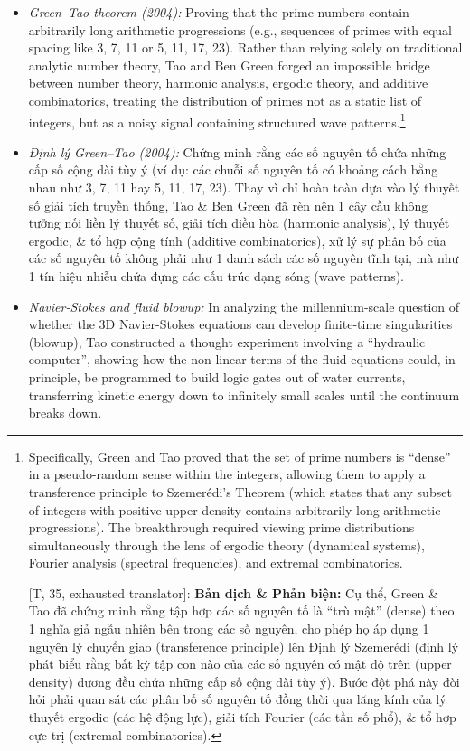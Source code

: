 \documentclass[11pt]{article}
\begin{document}
\begin{itemize}
    \item \emph{Green--Tao theorem (2004):} Proving that the prime numbers contain arbitrarily long arithmetic progressions (e.g., sequences of primes with equal spacing like 3, 7, 11 or 5, 11, 17, 23). Rather than relying solely on traditional analytic number theory, Tao and Ben Green forged an impossible bridge between number theory, harmonic analysis, ergodic theory, and additive combinatorics, treating the distribution of primes not as a static list of integers, but as a noisy signal containing structured wave patterns.\footnote{Specifically, Green and Tao proved that the set of prime numbers is ``dense'' in a pseudo-random sense within the integers, allowing them to apply a transference principle to Szemer\'edi's Theorem (which states that any subset of integers with positive upper density contains arbitrarily long arithmetic progressions). The breakthrough required viewing prime distributions simultaneously through the lens of ergodic theory (dynamical systems), Fourier analysis (spectral frequencies), and extremal combinatorics.
    	
    	\textsf{[T, 35, exhausted translator]:} \textbf{Bản dịch \& Phản biện:} Cụ thể, Green \& Tao đã chứng minh rằng tập hợp các số nguyên tố là ``trù mật'' (dense) theo 1 nghĩa giả ngẫu nhiên bên trong các số nguyên, cho phép họ áp dụng 1 nguyên lý chuyển giao (transference principle) lên Định lý Szemer\'edi (định lý phát biểu rằng bất kỳ tập con nào của các số nguyên có mật độ trên (upper density) dương đều chứa những cấp số cộng dài tùy ý). Bước đột phá này đòi hỏi phải quan sát các phân bố số nguyên tố đồng thời qua lăng kính của lý thuyết ergodic (các hệ động lực), giải tích Fourier (các tần số phổ), \& tổ hợp cực trị (extremal combinatorics).}

\item \emph{Định lý Green--Tao (2004):} Chứng minh rằng các số nguyên tố chứa những cấp số cộng dài tùy ý (ví dụ: các chuỗi số nguyên tố có khoảng cách bằng nhau như 3, 7, 11 hay 5, 11, 17, 23). Thay vì chỉ hoàn toàn dựa vào lý thuyết số giải tích truyền thống, Tao \& Ben Green đã rèn nên 1 cây cầu không tưởng nối liền lý thuyết số, giải tích điều hòa (harmonic analysis), lý thuyết ergodic, \& tổ hợp cộng tính (additive combinatorics), xử lý sự phân bố của các số nguyên tố không phải như 1 danh sách các số nguyên tĩnh tại, mà như 1 tín hiệu nhiễu chứa đựng các cấu trúc dạng sóng (wave patterns).

\item \emph{Navier-Stokes and fluid blowup:} In analyzing the millennium-scale question of whether the 3D Navier-Stokes equations can develop finite-time singularities (blowup), Tao constructed a thought experiment involving a ``hydraulic computer'', showing how the non-linear terms of the fluid equations could, in principle, be programmed to build logic gates out of water currents, transferring kinetic energy down to infinitely small scales until the continuum breaks down.


\end{itemize}
\end{document}
